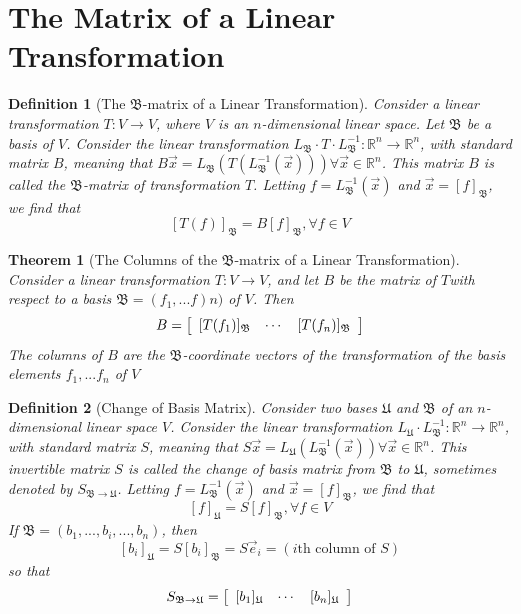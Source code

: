 \documentclass[10pt]{report}
\newtheorem{thm2}{Theorem}[section]
\newtheorem{def2}{Definition}[section]
\begin{document}
\section{The Matrix of a Linear Transformation}
\begin{def2}[The $\mathfrak{B}$-matrix of a Linear Transformation]
Consider a linear transformation $T:V\to V$, where $V$ is an $n$-dimensional linear space. Let $\mathfrak{B}$ be a basis of $V$. Consider the linear transformation $L_\mathfrak{B} \cdot T \cdot L_\mathfrak{B}^{-1}:\mathbb{R}^n\to \mathbb{R}^n$, with standard matrix $B$, meaning that $B\vec{x} = L_\mathfrak{B}(T(L_\mathfrak{B}^{-1}(\vec{x}))) \forall \vec{x}\in \mathbb{R}^n$. This matrix $B$ is called the $\mathfrak{B}$-matrix of transformation $T$. Letting $f=L_\mathfrak{B}^{-1}(\vec{x})$ and $\vec{x}=[f]_\mathfrak{B}$, we find that
$$[T(f)]_\mathfrak{B} = B[f]_\mathfrak{B}, \forall f\in V$$
\end{def2}
\begin{thm2}[The Columns of the $\mathfrak{B}$-matrix of a Linear Transformation]
Consider a linear transformation $T:V\to V$, and let $B$ be the matrix of $T$with respect to a basis $\mathfrak{B} = (f_1,...f)n)$ of $V$. Then
$$B = \left[ \begin{array}{c c c}[T(f_1)]_\mathfrak{B} & \cdots & [T(f_n)]_\mathfrak{B} \end{array} \right]$$
The columns of $B$ are the $\mathfrak{B}$-coordinate vectors of the transformation of the basis elements $f_1,...f_n$ of $V$
\end{thm2}
\begin{def2}[Change of Basis Matrix]
Consider two bases $\mathfrak{U}$ and $\mathfrak{B}$ of an $n$-dimensional linear space $V$. Consider the linear transformation $L_\mathfrak{U} \cdot L_\mathfrak{B}^{-1}:\mathbb{R}^n \to \mathbb{R}^n$, with standard matrix $S$, meaning that $S\vec{x} = L_\mathfrak{U}(L_\mathfrak{B}^{-1}(\vec{x}))\forall \vec{x}\in \mathbb{R}^n$. This invertible matrix $S$ is called the change of basis matrix from $\mathfrak{B}$ to $\mathfrak{U}$, sometimes denoted by $S_{\mathfrak{B} \to \mathfrak{U}}$. Letting $f = L_\mathfrak{B}^{-1}(\vec{x})$ and $\vec{x}=[f]_\mathfrak{B}$, we find that
$$[f]_\mathfrak{U} = S[f]_\mathfrak{B}, \forall f\in V$$
If $\mathfrak{B} = (b_1,...,b_i,...,b_n)$, then
$$[b_i]_\mathfrak{U} = S[b_i]_\mathfrak{B} = S\vec{e}_i = (i\text{th column of }S)$$
so that
$$S_{\mathfrak{B}\to \mathfrak{U}} = \left[ \begin{array}{c c c }
[b_1]_\mathfrak{U} & \cdots & [b_n]_\mathfrak{U}
\end{array}\right]$$
\end{def2}
\end{document}
